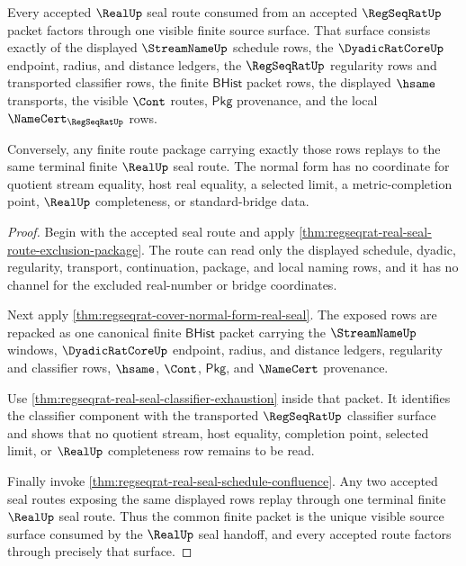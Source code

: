 \begin{theorem}\label{thm:regseqrat-seal-route-visible-source-normal-form}
Every accepted $\RealUp$ seal route consumed from an accepted $\RegSeqRatUp$
packet factors through one visible finite source surface. That surface consists
exactly of the displayed $\StreamNameUp$ schedule rows, the
$\DyadicRatCoreUp$ endpoint, radius, and distance ledgers, the $\RegSeqRatUp$
regularity rows and transported classifier rows, the finite $\mathsf{BHist}$
packet rows, the displayed $\hsame$ transports, the visible $\Cont$ routes,
$\mathsf{Pkg}$ provenance, and the local $\NameCert_{\RegSeqRatUp}$ rows.

Conversely, any finite route package carrying exactly those rows replays to
the same terminal finite $\RealUp$ seal route. The normal form has no
coordinate for quotient stream equality, host real equality, a selected limit,
a metric-completion point, $\RealUp$ completeness, or standard-bridge data.
\end{theorem}
\begin{proof}
Begin with the accepted seal route and apply
\autoref{thm:regseqrat-real-seal-route-exclusion-package}. The route can read
only the displayed schedule, dyadic, regularity, transport, continuation,
package, and local naming rows, and it has no channel for the excluded
real-number or bridge coordinates.

Next apply \autoref{thm:regseqrat-cover-normal-form-real-seal}. The exposed
rows are repacked as one canonical finite $\mathsf{BHist}$ packet carrying the
$\StreamNameUp$ windows, $\DyadicRatCoreUp$ endpoint, radius, and distance
ledgers, regularity and classifier rows, $\hsame$, $\Cont$, $\mathsf{Pkg}$,
and $\NameCert$ provenance.

Use \autoref{thm:regseqrat-real-seal-classifier-exhaustion} inside that packet.
It identifies the classifier component with the transported $\RegSeqRatUp$
classifier surface and shows that no quotient stream, host equality,
completion point, selected limit, or $\RealUp$ completeness row remains to be
read.

Finally invoke \autoref{thm:regseqrat-real-seal-schedule-confluence}. Any two
accepted seal routes exposing the same displayed rows replay through one
terminal finite $\RealUp$ seal route. Thus the common finite packet is the
unique visible source surface consumed by the $\RealUp$ seal handoff, and every
accepted route factors through precisely that surface.
\end{proof}
